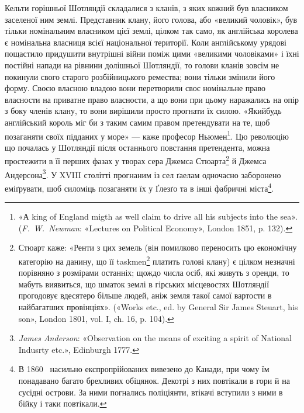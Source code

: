 Кельти горішньої Шотляндії складалися з кланів, з яких
кожний був власником заселеної ним землі. Представник клану,
його голова, або «великий чоловік», був тільки номінальним власником цієї землі,
цілком так само, як англійська королева є номінальна власниця всієї
національної території. Коли англійському урядові пощастило придушити
внутрішні війни поміж цими «великими чоловіками» і їхні
постійні напади на рівнини долішньої Шотляндії, то голови кланів
зовсім не покинули свого старого розбійницького ремества;
вони тільки змінили його форму. Своєю власною владою вони перетворили своє
номінальне право власности на приватне право власности,
а що вони при цьому наражались на опір з боку членів клану, то вони
вирішили просто прогнати їх силою. «Якийбудь англійський король міг би з
таким самим правом претендувати на те, щоб позаганяти своїх підданих у море»
— каже професор Ньюмен\footnote{
«А king of England migth as well claim to drive all his subjects into the sea».
(\emph{F.~W.~Newman}: «Lectures on Political Economy», London 1851, p. 132).
}. Цю революцію що почалась у Шотляндії після останнього повстання претендента,
можна простежити в її перших фазах у творах сера Джемса Стюарта\footnote{
Стюарт каже: «Ренти з цих земель (він помилково переносить цю економічну
категорію на данину, що її taskmen\footnote*{
— васаль. \emph{Ред.}
} платить голові клану) є цілком незначні порівняно з розмірами останніх;
щождо числа осіб, які живуть з оренди, то мабуть виявиться, що шматок
землі в гірських місцевостях Шотляндії прогодовує вдесятеро більше людей,
аніж земля такої самої вартости в найбагатших провінціях».
(«Works etc., ed. by General Sir James Steuart, his son», London 1801, vol. I,
ch. 16, p. 104).
} й Джемса Андерсона\footnote{
\emph{James Anderson}: «Observation on the means of exciting a spirit of
National Indusrty etc.», Edinburgh 1777.
}. У XVIII столітті
прогнаним із сел ґаелам одночасно заборонено еміґрувати,
шоб силоміць позаганяти їх у Ґлезґо та в інші фабричні міста\footnote{
В 1860~ насильно експропрійованих вивезено до Канади, при
чому їм понадавано багато брехливих обіцянок. Декотрі з них повтікали
в гори й на сусідні острови. За ними погнались поліціянти, втікачі вступили
з ними в бійку і таки повтікали.
}.
